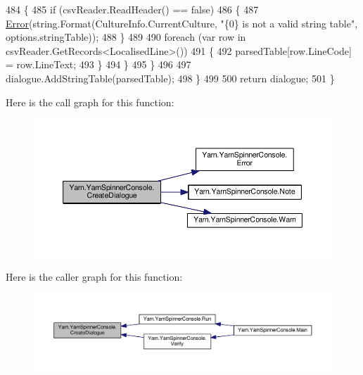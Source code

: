 \begin{DoxyCode}
484                     \{
485                         \textcolor{keywordflow}{if} (csvReader.ReadHeader() == \textcolor{keyword}{false})
486                         \{
487                             \hyperlink{a00174_a2f63f9f5b7634cb50ee75ff2eb18b137}{Error}(\textcolor{keywordtype}{string}.Format(CultureInfo.CurrentCulture, \textcolor{stringliteral}{"\{0\} is not a valid string
       table"}, options.stringTable));
488                         \}
489 
490                         \textcolor{keywordflow}{foreach} (var row \textcolor{keywordflow}{in} csvReader.GetRecords<LocalisedLine>())
491                         \{
492                             parsedTable[row.LineCode] = row.LineText;
493                         \}
494                     \}
495                 \}
496 
497                 dialogue.AddStringTable(parsedTable);
498             \}
499 
500             \textcolor{keywordflow}{return} dialogue;
501         \}
\end{DoxyCode}


Here is the call graph for this function\-:
\nopagebreak
\begin{figure}[H]
\begin{center}
\leavevmode
\includegraphics[width=350pt]{a00174_aab244361a510cee18ad2f636d110e0d5_cgraph}
\end{center}
\end{figure}




Here is the caller graph for this function\-:
\nopagebreak
\begin{figure}[H]
\begin{center}
\leavevmode
\includegraphics[width=350pt]{a00174_aab244361a510cee18ad2f636d110e0d5_icgraph}
\end{center}
\end{figure}


